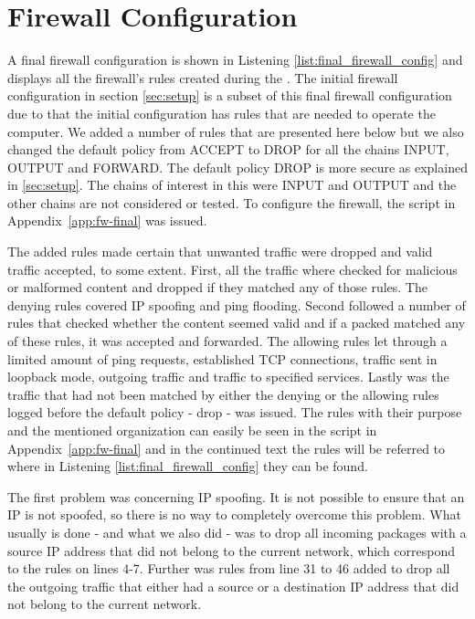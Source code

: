 \section{Firewall Configuration}
\label{sec:config}

A final firewall configuration is shown in Listening \ref{list:final_firewall_config} and displays all the firewall's rules created during the \lab{}. The initial firewall configuration in section \ref{sec:setup} is a subset of this final firewall configuration due to that the initial configuration has rules that are needed to operate the computer. We added a number of rules that are presented here below but we also changed the default policy from ACCEPT to DROP for all the chains INPUT, OUTPUT and FORWARD. The default policy DROP is more secure as explained in \ref{sec:setup}. The chains of interest in this \lab{} were INPUT and OUTPUT and the other chains are not considered or tested. To configure the firewall, the script in Appendix~\ref{app:fw-final} was issued.

The added rules made certain that unwanted traffic were dropped and valid traffic accepted, to some extent. First, all the traffic where checked for malicious or malformed content and dropped if they matched any of those rules. The denying rules covered IP spoofing and ping flooding. Second followed a number of rules that checked whether the content seemed valid and if a packed matched any of these rules, it was accepted and forwarded. The allowing rules let through a limited amount of ping requests, established TCP connections, traffic sent in loopback mode, outgoing traffic and traffic to specified services. Lastly was the traffic that had not been matched by either the denying or the allowing rules logged before the default policy - drop - was issued. The rules with their purpose and the mentioned organization can easily be seen in the script in Appendix~\ref{app:fw-final} and in the continued text the rules will be referred to where in Listening \ref{list:final_firewall_config} they can be found.

The first problem was concerning IP spoofing. It is not possible to ensure that an IP is not spoofed, so there is no way to completely overcome this problem. What usually is done - and what we also did - was to drop all incoming packages with a source IP address that did not belong to the current network, which correspond to the rules on lines 4-7. Further was rules from line 31 to 46 added to drop all the outgoing traffic that either had a source or a destination IP address that did not belong to the current network. 

